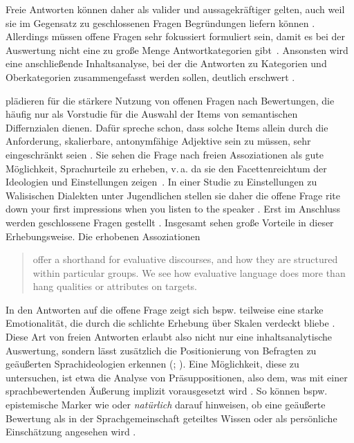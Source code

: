 Freie Antworten können daher als valider und aussagekräftiger gelten, auch weil sie im Gegensatz zu geschlossenen Fragen Begründungen liefern können \citep[s.][182--183]{Studler.2014}.
Allerdings müssen offene Fragen sehr fokussiert formuliert sein, damit es bei der Auswertung nicht eine zu große Menge Antwortkategorien gibt~\citep[s.][62--63]{Porst2014}.
Ansonsten wird eine anschließende Inhaltsanalyse, bei der die Antworten zu Kategorien und Oberkategorien zusammengefasst werden sollen, deutlich erschwert \citep[s.][3]{Schreier.2014}. 

\citet[196]{Garrett.2004} plädieren für die stärkere Nutzung von offenen Fragen nach Bewertungen, die häufig nur als Vorstudie für die Auswahl der Items von semantischen Differnzialen dienen. 
Dafür spreche schon, dass solche Items allein durch die Anforderung, skalierbare, antonymfähige Adjektive sein zu müssen, sehr eingeschränkt seien \citep[s.][196]{Garrett.2004}. 
Sie sehen die Frage nach freien Assoziationen als gute M{\"o}glichkeit, Sprachurteile zu erheben, v.\,a. da sie den Facettenreichtum der Ideologien und Einstellungen zeigen~\citep[s.][215]{Garrett.2004}. 
In einer Studie zu Einstellungen zu Walisischen Dialekten unter Jugendlichen stellen sie daher die offene Frage \glqq [w]rite down your first impressions when you listen to the speaker\grqq{} \citep[201]{Garrett.2004}.
Erst im Anschluss werden geschlossene Fragen gestellt \citep[s.][201]{Garrett.2004}. 
Insgesamt sehen \citeauthor{Garrett.2004} große Vorteile in dieser Erhebungsweise. 
Die erhobenen Assoziationen
\begin{quote}offer a shorthand for evaluative discourses, and how they are structured within particular groups. We see how evaluative language does more than hang qualities or attributes on targets. \citep[216]{Garrett.2004}\end{quote}
In den Antworten auf die offene Frage zeigt sich bspw. teilweise eine starke Emotionalität, die durch die schlichte Erhebung über Skalen verdeckt bliebe \citep[s.][216]{Garrett.2004}.
Diese Art von freien Antworten erlaubt also nicht nur eine inhaltsanalytische Auswertung, sondern lässt zusätzlich die Positionierung von Befragten zu geäußerten Sprachideologien erkennen (\citealp[s.][119]{Liebscher.2014}; \citealp[170]{Studler.2014}). 
Eine Möglichkeit, diese zu untersuchen, ist etwa die Analyse von Präsuppositionen, also dem, was mit einer sprachbewertenden Äußerung implizit vorausgesetzt wird \citep[s.][199]{Liebscher.2009}. 
So können bspw. epistemische Marker wie  oder \textit{natürlich} darauf hinweisen, ob eine %
geäußerte %
Bewertung als in der Sprachgemeinschaft geteiltes Wissen oder als persönliche Einschätzung angesehen wird \citep[s.][376]{Deppermann.2015}. 

